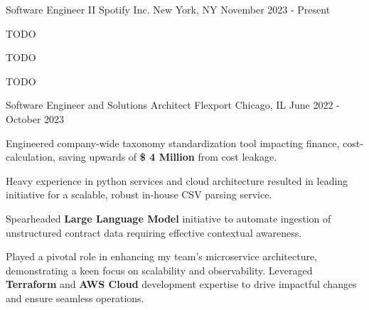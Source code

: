 

\begin{cventries}

  \cventry
  {Software Engineer II} %
  {Spotify Inc.} %
  {New York, NY} %
  {November 2023 - Present} %
  {
    \begin{cvitems} %
      \item {TODO}
      \item {TODO}
      \item {TODO}
    \end{cvitems}
  }

\cventry
    {Software Engineer and Solutions Architect} %
    {Flexport} %
    {Chicago, IL} %
    {June 2022 - October 2023} %
    {
      \begin{cvitems} %
        \item {Engineered company-wide taxonomy standardization tool impacting finance, cost-calculation, saving upwards of \textbf{\$ 4 Million} from cost leakage.}
        \item {Heavy experience in python services and cloud architecture resulted in leading initiative for a scalable, robust in-house CSV parsing service.}
        \item{Spearheaded \textbf{Large Language Model} initiative to automate ingestion of unstructured contract data requiring effective contextual awareness.}
        \item{Played a pivotal role in enhancing my team's microservice architecture, demonstrating a keen focus on scalability and observability. Leveraged \textbf{Terraform} and \textbf{AWS Cloud} development expertise to drive impactful changes and ensure seamless operations.}
      \end{cvitems}
    }


\end{cventries}
